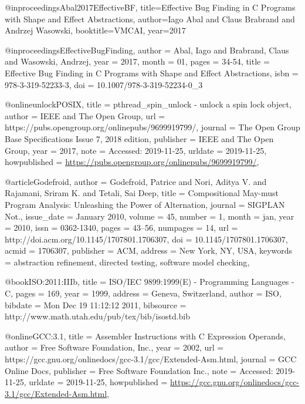 @inproceedings{Abal2017EffectiveBF,
  title={Effective Bug Finding in C Programs with Shape and Effect Abstractions},
  author={Iago Abal and Claus Brabrand and Andrzej Wasowski},
  booktitle={VMCAI},
  year={2017}
}

@inproceedings{EffectiveBugFinding,
author = {Abal, Iago and Brabrand, Claus and Wasowski, Andrzej},
year = {2017},
month = {01},
pages = {34-54},
title = {Effective Bug Finding in C Programs with Shape and Effect Abstractions},
isbn = {978-3-319-52233-3},
doi = {10.1007/978-3-319-52234-0_3}
}

@online{unlockPOSIX, 
title = {pthread\_spin\_unlock - unlock a spin lock object}, 
author = {IEEE and The Open Group},
url = {https://pubs.opengroup.org/onlinepubs/9699919799/}, 
journal = {The Open Group Base Specifications Issue 7, 2018 edition}, 
publisher = {IEEE and The Open Group}, 
year = 2017,
note = {Accessed: 2019-11-25},
urldate = {2019-11-25},
howpublished = {\url{https://pubs.opengroup.org/onlinepubs/9699919799/}},
}

@article{Godefroid,
 author = {Godefroid, Patrice and Nori, Aditya V. and Rajamani, Sriram K. and Tetali, Sai Deep},
 title = {Compositional May-must Program Analysis: Unleashing the Power of Alternation},
 journal = {SIGPLAN Not.},
 issue_date = {January 2010},
 volume = {45},
 number = {1},
 month = jan,
 year = {2010},
 issn = {0362-1340},
 pages = {43--56},
 numpages = {14},
 url = {http://doi.acm.org/10.1145/1707801.1706307},
 doi = {10.1145/1707801.1706307},
 acmid = {1706307},
 publisher = {ACM},
 address = {New York, NY, USA},
 keywords = {abstraction refinement, directed testing, software model checking},
} 

@book{ISO:2011:IIIb,
  title = {ISO/IEC 9899:1999(E) - Programming Languages - C},
  pages = {169},
  year = {1999},
  address = {Geneva, Switzerland},
  author = {ISO},
  bibdate = {Mon Dec 19 11:12:12 2011},
  bibsource = {http://www.math.utah.edu/pub/tex/bib/isostd.bib}
}

@online{GCC:3.1, 
title = {Assembler Instructions with C Expression Operands}, 
author = {Free Software Foundation, Inc.},
year = 2002,
url = {https://gcc.gnu.org/onlinedocs/gcc-3.1/gcc/Extended-Asm.html}, 
journal = {GCC Online Docs}, 
publisher = {Free Software Foundation Inc.}, 
note = {Accessed: 2019-11-25},
urldate = {2019-11-25},
howpublished = {\url{https://gcc.gnu.org/onlinedocs/gcc-3.1/gcc/Extended-Asm.html}},
}
